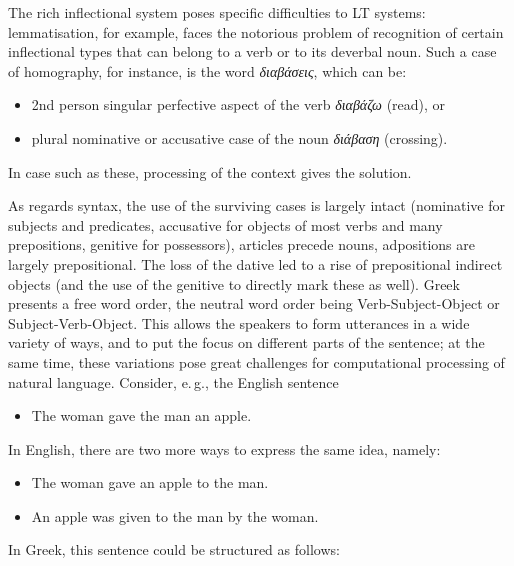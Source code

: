 \documentclass[]{../../metanetpaper}
\begin{document}
\begin{multicols}{2}

The rich inflectional system poses specific difficulties to LT systems: lemmatisation, for example, faces the notorious problem of recognition of certain inflectional types that can belong to a verb or to its deverbal noun. Such a case of homography, for instance, is the word \textit{διαβάσεις}, which can be:

\begin{itemize}    
\item 2nd person singular perfective aspect of the verb \textit{διαβάζω} (read), or
\item plural nominative or accusative case of the noun \textit{διάβαση} (crossing).
\end{itemize}

In case such as these, processing of the context gives the solution.
   
As regards syntax, the use of the surviving cases is largely intact (nominative for subjects and predicates, accusative for objects of most verbs and many prepositions, genitive for possessors), articles precede nouns, adpositions are largely prepositional. The loss of the dative led to a rise of prepositional indirect objects (and the use of the genitive to directly mark these as well). Greek presents a free word order, the neutral word order being Verb-Subject-Object or Subject-Verb-Object. This allows the speakers to form utterances in a wide variety of ways, and to put the focus on different parts of the sentence; at the same time, these variations pose great challenges for computational processing of natural language. Consider, e.\,g., the English sentence

\begin{itemize}    
\item[] The woman gave the man an apple.
\end{itemize}

In English, there are two more ways to express the same idea, namely:

\begin{itemize}    
\item The woman gave an apple to the man.
\item An apple was given to the man by the woman.
\end{itemize}

In Greek, this sentence could be structured as follows:


\end{multicols}
\end{document}

